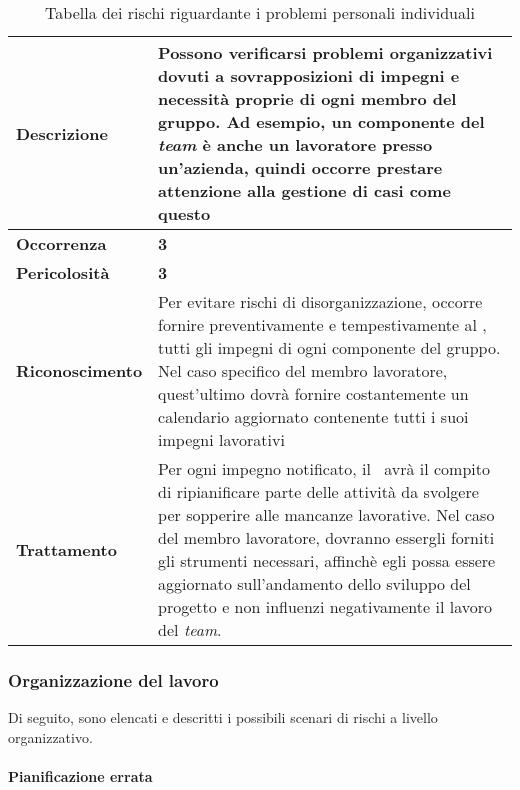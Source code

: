 \begin{table}[H]
	\begin{center}
		\begin{tabular}{|>{\centering\arraybackslash} m{3cm}  ||>{\centering\arraybackslash} m{10cm}|}
			\hline
			\textbf{Descrizione}	& Possono verificarsi problemi organizzativi dovuti a sovrapposizioni di impegni e necessità proprie di ogni membro del gruppo. Ad esempio, un componente del \textit{team\ped{G}} è anche un lavoratore presso un'azienda, quindi occorre prestare attenzione alla gestione di casi come questo \\
			\hline
			\textbf{Occorrenza}	&	\textbf{3}	\\
			\hline
			\textbf{Pericolosità}	&	\textbf{3}	\\
			\hline
			\textbf{Riconoscimento}	&	Per evitare rischi di disorganizzazione, occorre fornire preventivamente e tempestivamente al \textit{\Res}, tutti gli impegni di ogni componente del gruppo. Nel caso specifico del membro lavoratore, quest'ultimo dovrà fornire costantemente un calendario aggiornato contenente tutti i suoi impegni lavorativi	\\
			\hline
			\textbf{Trattamento}	&	Per ogni impegno notificato, il \textit{\Res}\ avrà il compito di ripianificare parte delle attività da svolgere per sopperire alle mancanze lavorative. Nel caso del membro lavoratore, dovranno essergli forniti gli strumenti necessari, affinchè egli possa essere aggiornato sull'andamento dello sviluppo del progetto e non influenzi negativamente il lavoro del \textit{team\ped{G}}.	\\
			\hline
		\end{tabular}
		\caption{Tabella dei rischi riguardante i problemi personali individuali}
	\end{center}
\end{table}

\subsubsection{Organizzazione del lavoro}

Di seguito, sono elencati e descritti i possibili scenari di rischi a livello organizzativo.

\paragraph{Pianificazione errata}

